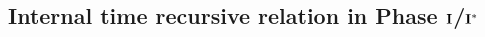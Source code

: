 \documentclass[
	10pt, %
	a4paper,
]{LegrandOrangeBook}
\begin{document}
\begin{appendices}

\chapterspaceabove{6.75cm}
\chapterspacebelow{7cm}

\chapter{\label{appendix_RR} Internal time recursive relation in Phase ${\rm {\bf I}}$/${\rm {\bf I}}^{*}$}



\end{appendices}

\end{document}
